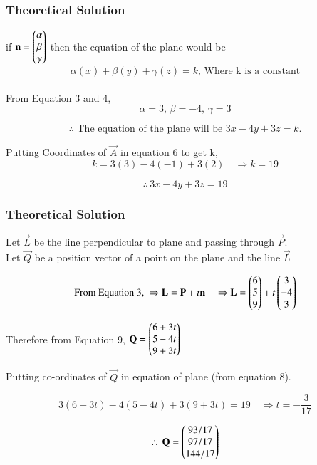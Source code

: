 \documentclass{beamer}
\begin{document}
\begin{frame}[fragile]
\frametitle{Theoretical Solution}
if $\mathbf{n} = \begin{pmatrix}\alpha \\ \beta \\ \gamma\end{pmatrix}$ then the equation of the plane would be
\begin{equation}
    \alpha(x) + \beta(y) + \gamma(z) = k \text{, Where k is a constant}
\end{equation}\\

From Equation 3 and 4, 
\begin{equation}
    \alpha = 3, \, \beta = -4, \, \gamma = 3
\end{equation}

\begin{equation}
\therefore
\text{ The equation of the plane will be } 3x-4y+3z = k.
\end{equation}


Putting Coordinates of $\vec{A}$ in equation 6 to get k,
\begin{equation}
    k=3(3) - 4(-1) + 3(2) \quad \Rightarrow k= 19
\end{equation}

\begin{equation}
\therefore \, 3x-4y+3z=19
\end{equation}
\end{frame}


\begin{frame}[fragile]
    \frametitle{Theoretical Solution}
    Let $\vec{L}$ be the line perpendicular to plane and passing through $\vec{P}$.\\
Let $\vec{Q}$ be a position vector of a point on the plane and the line $\vec{L}$

\begin{equation}
\text{From Equation 3, } \Rightarrow 
\mathbf{L} = \mathbf{P} + t\mathbf{n}
\quad \Rightarrow \mathbf{L} = \begin{pmatrix}6 \\ 5 \\ 9\end{pmatrix} + t\begin{pmatrix}3 \\ -4 \\ 3\end{pmatrix}
\end{equation}


Therefore from Equation 9,
$\mathbf{Q} = \begin{pmatrix}6+3t \\ 5-4t \\ 9+3t\end{pmatrix}$

Putting co-ordinates of $\vec{Q}$ in equation of plane (from equation 8).

\begin{equation}
    3(6+3t) - 4(5-4t) + 3(9+3t) = 19 \quad \Rightarrow t=-\dfrac{3}{17}  
\end{equation}

\begin{equation}
    \therefore \, \mathbf{Q}=\begin{pmatrix}93/17 \\ 97/17 \\ 144/17\end{pmatrix}
\end{equation}
\end{frame}
\end{document}
